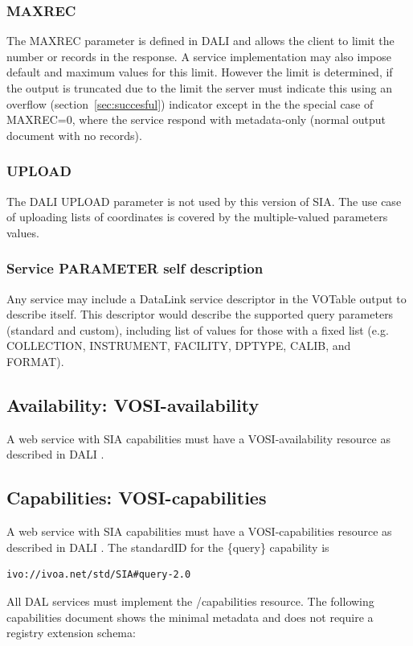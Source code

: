 \documentclass[11pt,a4paper]{ivoa}
\begin{document}
\subsubsection{MAXREC}
The MAXREC parameter is defined in DALI and allows the client to limit the number or records in the response. A service implementation may also impose default and maximum values for this limit. However the limit is determined, if the output is truncated due to the limit the server must indicate this using an overflow  (section~\ref{sec:succesful}) indicator except in the the special case of MAXREC=0, where the  service respond with metadata-only (normal output document with no records).

\subsubsection{UPLOAD}
 The DALI UPLOAD parameter is not used by this version of SIA. The use case of uploading lists of coordinates is covered by the multiple-valued parameters values.

\subsubsection{Service PARAMETER self description}
\label{sec:selfdesc}
Any service may  include a DataLink service descriptor in the VOTable output to describe itself. This descriptor would describe the supported query parameters (standard and custom), including list of values for those with a fixed list (e.g. COLLECTION, INSTRUMENT, FACILITY, DPTYPE, CALIB, and FORMAT).

\subsection{Availability: VOSI-availability}
A web service with SIA capabilities must have a VOSI-availability resource \citep{std:VOSI}  as described in DALI .
\subsection{Capabilities: VOSI-capabilities}
A web service with SIA capabilities must have a VOSI-capabilities resource \citep{std:VOSI} as described in DALI . The standardID for the \{query\} capability is 

\begin{lstlisting}
ivo://ivoa.net/std/SIA#query-2.0
\end{lstlisting}

All DAL services must implement the /capabilities resource. The following capabilities document shows the minimal metadata and does not require a registry extension schema:
\end{document}
